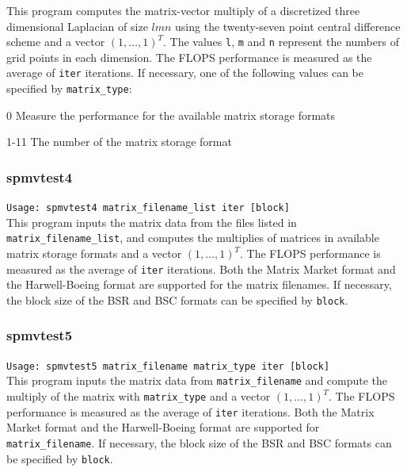 \documentclass[a4paper]{article}
\newcommand{\namelistlabel}[1]{\mbox{#1}\hfill}
\newenvironment{namelist}[1]{%
\begin{list}{}
  {\let\makelabel\namelistlabel
  \settowidth{\labelwidth}{#1}
  \setlength{\leftmargin}{1.1\labelwidth}}
  }{%
\end{list}}
\begin{document}
This program computes the matrix-vector multiply of a 
discretized three dimensional Laplacian of size $lmn$ using 
the twenty-seven point central difference scheme and a vector $(1,\dots,1)^T$. 
The values {\tt l}, {\tt m} and {\tt n} represent the numbers of grid
points in each dimension. 
The FLOPS performance is measured as the average of {\tt iter}
iterations.
If necessary, one of the following values can be specified by {\tt matrix\_type}:
\begin{namelist}{XXXXXXXXXXXXXXXXXXXX}
\item[0] Measure the performance for the available matrix storage formats
\item[1-11] The number of the matrix storage format
\end{namelist}

\subsubsection{spmvtest4}

\verb+Usage: spmvtest4 matrix_filename_list iter [block]+\\

This program inputs the matrix data from the files listed in {\tt matrix\_filename\_list}, 
and computes the multiplies of matrices in available matrix 
storage formats and a vector $(1,\dots,1)^T$. 
The FLOPS performance is measured as the average of {\tt iter}
iterations.
Both the Matrix Market format and the Harwell-Boeing format are
supported for the matrix filenames. 
If necessary, the block size of the BSR and BSC formats can be specified
by {\tt block}.

\subsubsection{spmvtest5}

\verb+Usage: spmvtest5 matrix_filename matrix_type iter [block]+\\

This program inputs the matrix data from {\tt matrix\_filename} 
and compute the multiply of the matrix 
with \verb|matrix_type| and a vector $(1,\dots,1)^T$. 
The FLOPS performance is measured as the average of {\tt iter} iterations.
Both the Matrix Market format and the Harwell-Boeing format are
supported for {\tt matrix\_filename}. 
If necessary, the block size of the BSR and BSC formats can be specified by {\tt block}.
\end{document}
